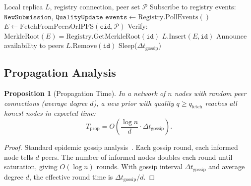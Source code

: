 \documentclass[11pt]{article}
\newtheorem{proposition}[theorem]{Proposition}
\begin{document}
\begin{algorithm}[H]
\caption{DSO Gossip Protocol (per node)}
\label{alg:gossip}
\begin{algorithmic}[1]
\Require Local replica $L$, registry connection, peer set $\mathcal{P}$
\State Subscribe to registry events: $\texttt{NewSubmission}$, $\texttt{QualityUpdate}$
\Loop
    \State $\texttt{events} \gets \text{Registry.PollEvents}()$
            \State $E \gets \text{FetchFromPeersOrIPFS}(\texttt{cid}, \mathcal{P})$
            \State Verify: $\text{MerkleRoot}(E) = \text{Registry.GetMerkleRoot}(\texttt{id})$
                \State $L.\text{Insert}(E, \texttt{id})$
                \State Announce availability to peers
            \EndIf
        \EndIf
    \EndFor
            \State $L.\text{Remove}(\texttt{id})$
        \EndIf
    \EndFor
    \State Sleep($\Delta t_{\text{gossip}}$)
\EndLoop
\end{algorithmic}
\end{algorithm}

\subsection{Propagation Analysis}

\begin{proposition}[Propagation Time]
\label{prop:propagation}
In a network of $n$ nodes with random peer connections (average degree $d$),
a new prior with quality $q \geq q_{\text{fetch}}$ reaches all honest nodes
in expected time:
\begin{equation}
    T_{\text{prop}} = O\left(\frac{\log n}{d} \cdot \Delta t_{\text{gossip}}\right).
\end{equation}
\end{proposition}

\begin{proof}
Standard epidemic gossip analysis~\cite{demers1987epidemic}. Each gossip round,
each informed node tells $d$ peers. The number of informed nodes doubles each
round until saturation, giving $O(\log n)$ rounds. With gossip interval
$\Delta t_{\text{gossip}}$ and average degree $d$, the effective round time is
$\Delta t_{\text{gossip}} / d$.
\end{proof}
\end{document}
